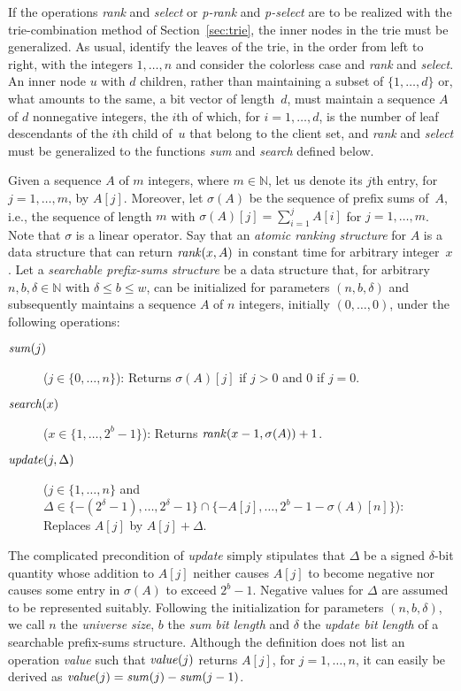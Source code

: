 \documentclass[envcountsame,envcountsect,undated,nolinenumbers]{lnthi}
\def\Tvn#1{\hbox{\textit{#1\/}}}
\def\TbbbN{\mathbb{N}}
\begin{document}
If the operations \Tvn{rank} and \Tvn{select}
or \Tvn{p-rank} and \Tvn{p-select} are to be realized
with the trie-combination method of
Section~\ref{sec:trie}, the inner nodes
in the trie must be generalized.
As usual, identify the leaves of the trie, in
the order from left to right, with the integers
$1,\ldots,n$ and consider the colorless case
and \Tvn{rank} and \Tvn{select}.
An inner node $u$ with $d$ children, rather than maintaining
a subset of $\{1,\ldots,d\}$ or, what amounts to
the same, a bit vector of length~$d$, must maintain
a sequence $A$ of $d$ nonnegative integers, the $i$th
of which, for $i=1,\ldots,d$, is the number of
leaf descendants of the $i$th child of~$u$
that belong to the client set, and \Tvn{rank}
and \Tvn{select} must be generalized to the
functions \Tvn{sum} and \Tvn{search}
defined below.

Given a sequence $A$ of $m$ integers, where
$m\in\TbbbN$, let us denote its $j$th entry,
for $j=1,\ldots,m$, by $A[j]$.
Moreover, let $\sigma(A)$ be the
sequence of prefix sums of~$A$, i.e., the
sequence of length $m$ with
$\sigma(A)[j]=\sum_{i=1}^j A[i]$ for $j=1,\ldots,m$.
Note that $\sigma$ is a linear operator.
Say that an \emph{atomic ranking structure}
for $A$ is a data structure that can return
$\Tvn{rank}(x,A)$ in constant time for
arbitrary integer~$x$.
Let a \emph{searchable prefix-sums structure}
be a data structure that, for arbitrary
$n,b,\delta\in\TbbbN$ with $\delta\le b\le w$,
can be initialized for parameters
$(n,b,\delta)$ and subsequently
maintains a sequence $A$
of $n$ integers, initially $(0,\ldots,0)$,
under the following operations:

\begin{description}
\item[\normalfont$\Tvn{sum}(j)$]
($j\in\{0,\ldots,n\}$):
Returns $\sigma(A)[j]$ if $j>0$ and 0 if $j=0$.
\item[\normalfont$\Tvn{search}(x)$]
($x\in\{1,\ldots,2^b-1\}$):
Returns $\Tvn{rank}(x-1,\sigma(A))+1$.
\item[\normalfont$\Tvn{update}(j,\Delta)$]
($j\in\{1,\ldots,n\}$ and
$\Delta\in\{-(2^\delta-1),\ldots,2^\delta-1\}\cap
\{-A[j],\ldots,2^b-1-\sigma(A)[n]\}$):
Replaces $A[j]$ by $A[j]+\Delta$.
\end{description}

\noindent
The complicated precondition of \Tvn{update}
simply stipulates that $\Delta$ be a signed $\delta$-bit
quantity whose addition to $A[j]$ neither causes
$A[j]$ to become negative nor causes
some entry in $\sigma(A)$
to exceed $2^b-1$.
Negative values for $\Delta$ are assumed
to be represented suitably.
Following the initialization for parameters $(n,b,\delta)$,
we call $n$ the \emph{universe size},
$b$ the \emph{sum bit length} and
$\delta$ the \emph{update bit length} of a searchable
prefix-sums structure.
Although the definition does not list an operation
\Tvn{value} such that $\Tvn{value}(j)$ returns $A[j]$,
for $j=1,\ldots,n$, it can easily be derived as
$\Tvn{value}(j)=\Tvn{sum}(j)-\Tvn{sum}(j-1)$.
\end{document}
